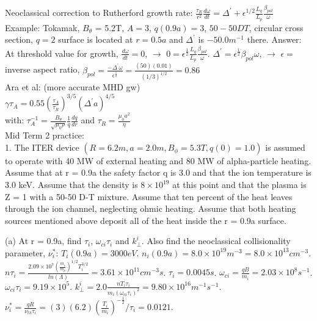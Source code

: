\documentclass[10pt]{extarticle}
\begin{document}
\begin{multicols}{3}
Neoclassical correction to Rutherford growth rate:
$\frac{\tau_{R}}{r^{2}} \frac{d\omega}{dt} = \Delta ^{\prime} + \epsilon^{1/2}\frac{L_{q}}{L_{p}}\frac{\beta_{pol}}{\omega}$\\

Example: Tokamak, $B_{\theta}$ = 5.2T, $A = 3$, $q(0.9a) = 3$, $50-50DT$, circular cross section, $q=2$ surface is located at $r = 0.5a$ and $\Delta^{\prime}$ is $-50.0 m^{-1}$ there.  Answer:  At threshold value for growth, $\frac{d\omega}{dt} = 0$, $\rightarrow$  $0 = \epsilon^{\frac{1}{2}} \frac{L_{q}}{L_{p}}\frac{\beta_{pol}}{\omega}$.  $\Delta^{\prime} = \epsilon^{\frac{1}{2}} \beta_{pol} \omega$, $\rightarrow$ $\epsilon =$ inverse aspect ratio, $\beta_{pol} = \frac{-\Delta^{\prime}\omega}{\epsilon^{\frac{1}{2}}} = \frac{(50)(0.01)}{(1/3)^{1/2}} = 0.86$\\

Ara et al: (more accurate MHD gw)\\
$\gamma \tau_{A} = 0.55 (\frac{\tau_{A}}{\tau_{R}})^{3/5}(\Delta^{\prime}a)^{4/5}$\\
with: $\tau_{A} ^{-1}= \frac{B_{\theta}}{\sqrt{\mu_{0}\rho}}\frac{1}{q}\frac{dq}{dr}$
 and $\tau_{R} = \frac{\mu_{0}a^{2}}{\eta}$\\
 
 Mid Term 2 practice:\\
 1.  The ITER device $(R=6.2m,a=2.0m,B_{\phi} = 5.3T,q(0)=1.0)$ is assumed to operate with 40 MW of external heating and 80 MW of alpha-particle heating. Assume that at r = 0.9a the safety factor q is 3.0 and that the ion temperature is 3.0 keV.  Assume that the density is $8\times 10^{19}$ at this point and that the plasma is Z = 1 with a 50-50 D-T mixture.  Assume that ten percent of the heat leaves through the ion channel, neglecting ohmic heating.  Assume that both heating sources mentioned above deposit all of the heat inside the r = 0.9a surface. 
 
 (a) At r = 0.9a, find $\tau_{i}$, $\omega_{ci}\tau_{i}$ and $k_{\perp}^{i}$.  Also find the neoclassical collisionality parameter, $\nu_{i}^{*}$:  $T_{i}(0.9a) = 3000eV$.  $n_{i}(0.9a) = 8.0\times 10^{19} m^{-3} = 8.0\times 10^{13} cm^{-3}$.  $n\tau_{i} = \frac{2.09\times 10^{7}(\frac{m_{i}}{m_{p}})^{1/2}T^{3/2}_{i}}{ln(\Lambda)} = 3.61\times 10^{11} cm^{-3} s$.  $\tau_{i} = 0.0045 s$.  $\omega_{ci} = \frac{qB}{m_{i}} = 2.03 \times 10^{8}s^{-1}$. $\omega_{ci}\tau_{i} = 9.19\times 10^{5}$.  $k_{\perp}^{i} = 2.0 \frac{nT_{i}\tau_{i}}{m_{i}(\omega_{ci}\tau_{i})^{2}} = 9.80 \times 10^{16} m^{-1}s^{-1}$.  $\nu_{i}^{*} = \frac{qR}{\nu_{th}\tau_{i}} = (3)(6.2)(\frac{T_{i}}{m_{i}})^{-\frac{1}{2}} / \tau_{i} = 0.0121$.  
 

\end{multicols}
\end{document}
